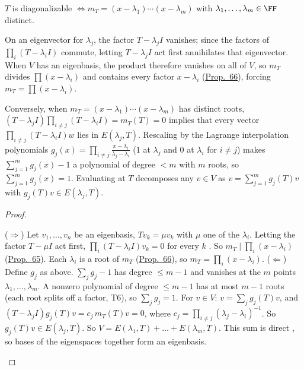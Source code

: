 \documentclass[10pt]{scrartcl}
\begin{document}
\begin{proposition*}\hypertarget{prop-68}{}\label{prop-68}
  $T$ is diagonalizable $\iff m_T=(x-\lambda_1)\cdots(x-\lambda_m)$ with $\lambda_1,\dots,\lambda_m\in\FF$ distinct.
\end{proposition*}
\begin{ideabox}
On an eigenvector for $\lambda_j$, the factor $T-\lambda_jI$ vanishes; since the factors of $\prod_i(T-\lambda_iI)$ commute, letting $T-\lambda_jI$ act first annihilates that eigenvector. When $V$ has an eigenbasis, the product therefore vanishes on all of $V$, so $m_T$ divides $\prod(x-\lambda_i)$ and contains every factor $x-\lambda_i$ (\hyperref[prop-66]{Prop.~66}), forcing $m_T=\prod(x-\lambda_i)$.

Conversely, when $m_T=(x-\lambda_1)\cdots(x-\lambda_m)$ has distinct roots, $(T-\lambda_jI)\prod_{i\ne j}(T-\lambda_iI)=m_T(T)=0$ implies that every vector $\prod_{i\ne j}(T-\lambda_iI)w$ lies in $E(\lambda_j,T)$. Rescaling by the Lagrange interpolation polynomials $g_j(x)=\prod_{i\ne j}\frac{x-\lambda_i}{\lambda_j-\lambda_i}$ ($1$ at $\lambda_j$ and $0$ at $\lambda_i$ for $i\ne j$) makes $\sum_{j=1}^m g_j(x)-1$ a polynomial of degree $<m$ with $m$ roots, so $\sum_{j=1}^m g_j(x)=1$. Evaluating at $T$ decomposes any $v\in V$ as $v=\sum_{j=1}^m g_j(T)v$ with $g_j(T)v\in E(\lambda_j,T)$.
\end{ideabox}
\begin{proof}
  \begin{steps}
    \ii ($\Rightarrow$) Let $v_1,\dots,v_n$ be an eigenbasis, $Tv_k=\mu v_k$ with $\mu$ one of the $\lambda_i$. Letting the factor $T-\mu I$ act first, $\prod_i(T-\lambda_iI)v_k=0$ for every $k$ . So $m_T\mid\prod_i(x-\lambda_i)$ (\hyperref[prop-65]{Prop.~65}). Each $\lambda_i$ is a root of $m_T$ (\hyperref[prop-66]{Prop.~66}), so $m_T=\prod_i(x-\lambda_i)$.
    \ii ($\Leftarrow$) Define $g_j$ as above. $\sum_jg_j-1$ has degree $\le m-1$ and vanishes at the $m$ points $\lambda_1,\dots,\lambda_m$. A nonzero polynomial of degree $\le m-1$ has at most $m-1$ roots (each root splits off a factor, T6), so $\sum_jg_j=1$.
    \ii For $v\in V$: $v=\sum_jg_j(T)v$, and $(T-\lambda_jI)g_j(T)v=c_j\,m_T(T)v=0$, where $c_j=\prod_{i\ne j}(\lambda_j-\lambda_i)^{-1}$. So $g_j(T)v\in E(\lambda_j,T)$.
    \ii So $V=E(\lambda_1,T)+\dots+E(\lambda_m,T)$. This sum is direct , so bases of the eigenspaces together form an eigenbasis.
  \end{steps}
\end{proof}
\end{document}
